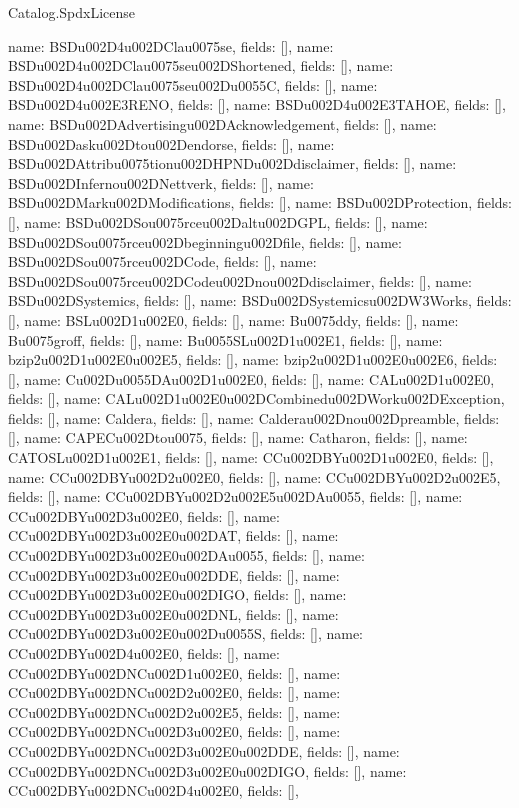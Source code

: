 \begin{lexlean}{Catalog.SpdxLicense}
\begin{semanticmodule}
{    {name: BSDu002D4u002DClau0075se, fields: []},
    {name: BSDu002D4u002DClau0075seu002DShortened, fields: []},
    {name: BSDu002D4u002DClau0075seu002Du0055C, fields: []},
    {name: BSDu002D4u002E3RENO, fields: []},
    {name: BSDu002D4u002E3TAHOE, fields: []},
    {name: BSDu002DAdvertisingu002DAcknowledgement, fields: []},
    {name: BSDu002Dasku002Dtou002Dendorse, fields: []},
    {name: BSDu002DAttribu0075tionu002DHPNDu002Ddisclaimer, fields: []},
    {name: BSDu002DInfernou002DNettverk, fields: []},
    {name: BSDu002DMarku002DModifications, fields: []},
    {name: BSDu002DProtection, fields: []},
    {name: BSDu002DSou0075rceu002Daltu002DGPL, fields: []},
    {name: BSDu002DSou0075rceu002Dbeginningu002Dfile, fields: []},
    {name: BSDu002DSou0075rceu002DCode, fields: []},
    {name: BSDu002DSou0075rceu002DCodeu002Dnou002Ddisclaimer, fields: []},
    {name: BSDu002DSystemics, fields: []},
    {name: BSDu002DSystemicsu002DW3Works, fields: []},
    {name: BSLu002D1u002E0, fields: []},
    {name: Bu0075ddy, fields: []},
    {name: Bu0075groff, fields: []},
    {name: Bu0055SLu002D1u002E1, fields: []},
    {name: bzip2u002D1u002E0u002E5, fields: []},
    {name: bzip2u002D1u002E0u002E6, fields: []},
    {name: Cu002Du0055DAu002D1u002E0, fields: []},
    {name: CALu002D1u002E0, fields: []},
    {name: CALu002D1u002E0u002DCombinedu002DWorku002DException, fields: []},
    {name: Caldera, fields: []},
    {name: Calderau002Dnou002Dpreamble, fields: []},
    {name: CAPECu002Dtou0075, fields: []},
    {name: Catharon, fields: []},
    {name: CATOSLu002D1u002E1, fields: []},
    {name: CCu002DBYu002D1u002E0, fields: []},
    {name: CCu002DBYu002D2u002E0, fields: []},
    {name: CCu002DBYu002D2u002E5, fields: []},
    {name: CCu002DBYu002D2u002E5u002DAu0055, fields: []},
    {name: CCu002DBYu002D3u002E0, fields: []},
    {name: CCu002DBYu002D3u002E0u002DAT, fields: []},
    {name: CCu002DBYu002D3u002E0u002DAu0055, fields: []},
    {name: CCu002DBYu002D3u002E0u002DDE, fields: []},
    {name: CCu002DBYu002D3u002E0u002DIGO, fields: []},
    {name: CCu002DBYu002D3u002E0u002DNL, fields: []},
    {name: CCu002DBYu002D3u002E0u002Du0055S, fields: []},
    {name: CCu002DBYu002D4u002E0, fields: []},
    {name: CCu002DBYu002DNCu002D1u002E0, fields: []},
    {name: CCu002DBYu002DNCu002D2u002E0, fields: []},
    {name: CCu002DBYu002DNCu002D2u002E5, fields: []},
    {name: CCu002DBYu002DNCu002D3u002E0, fields: []},
    {name: CCu002DBYu002DNCu002D3u002E0u002DDE, fields: []},
    {name: CCu002DBYu002DNCu002D3u002E0u002DIGO, fields: []},
    {name: CCu002DBYu002DNCu002D4u002E0, fields: []},
}
\end{semanticmodule}
\end{lexlean}
